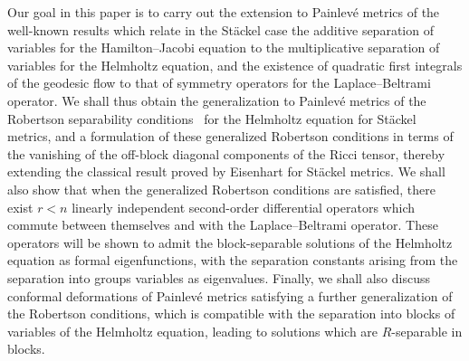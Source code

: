 \documentclass[11pt]{article}
\numberwithin{equation}{section}
\begin{document}
Our goal in this paper is to carry out the extension to Painlev\'e metrics of the well-known results \cite{Ben2016, BCR1-2002,BCR2-2002, Eis1934, KaMi1980, KaMi1981, KaMi1984} which relate in the St\"ackel case the additive separation of variables for the Hamilton--Jacobi equation to the multiplicative separation of variables for the Helmholtz equation, and the existence of quadratic first integrals of the geodesic flow to that of symmetry operators for the Laplace--Beltrami operator. We shall thus obtain the generalization to Painlev\'e metrics of the Robertson separability conditions~\cite{Rob1928} for the Helmholtz equation for St\"ackel metrics, and a formulation of these generalized Robertson conditions in terms of the vanishing of the off-block diagonal components of the Ricci tensor, thereby extending the classical result proved by Eisenhart \cite{Eis1934} for St\"ackel metrics. We shall also show that when the generalized Robertson conditions are satisfied, there exist $r<n$ linearly independent second-order differential operators which commute between themselves and with the Laplace--Beltrami operator. These operators will be shown to admit the block-separable solutions of the Helmholtz equation as formal eigenfunctions, with the separation constants arising from the separation into groups variables as eigenvalues. Finally, we shall also discuss conformal deformations of Painlev\'e metrics satisfying a further generalization of the Robertson conditions, which is compatible with the separation into blocks of variables of the Helmholtz equation, leading to solutions which are $R$-separable in blocks.
\end{document}
